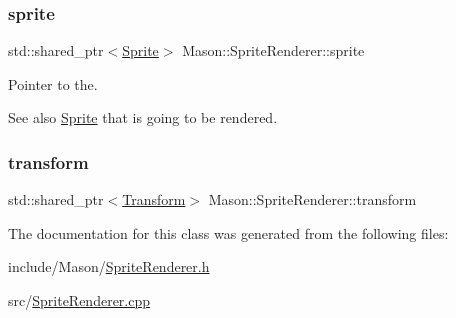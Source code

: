 \subsubsection{\texorpdfstring{sprite}{sprite}}
{\footnotesize\ttfamily std\+::shared\+\_\+ptr$<$\hyperlink{class_mason_1_1_sprite}{Sprite}$>$ Mason\+::\+Sprite\+Renderer\+::sprite}



Pointer to the. 

\begin{DoxySeeAlso}{See also}
\hyperlink{class_mason_1_1_sprite}{Sprite} that is going to be rendered. 
\end{DoxySeeAlso}
\hypertarget{class_mason_1_1_sprite_renderer_a6f117cc02c8fc27dac5692a2127bf329}{}\label{class_mason_1_1_sprite_renderer_a6f117cc02c8fc27dac5692a2127bf329} 
\subsubsection{\texorpdfstring{transform}{transform}}
{\footnotesize\ttfamily std\+::shared\+\_\+ptr$<$\hyperlink{class_mason_1_1_transform}{Transform}$>$ Mason\+::\+Sprite\+Renderer\+::transform\hspace{0.3cm}{\ttfamily [protected]}}



The documentation for this class was generated from the following files\+:\begin{DoxyCompactItemize}
\item 
include/\+Mason/\hyperlink{_sprite_renderer_8h}{Sprite\+Renderer.\+h}\item 
src/\hyperlink{_sprite_renderer_8cpp}{Sprite\+Renderer.\+cpp}\end{DoxyCompactItemize}
